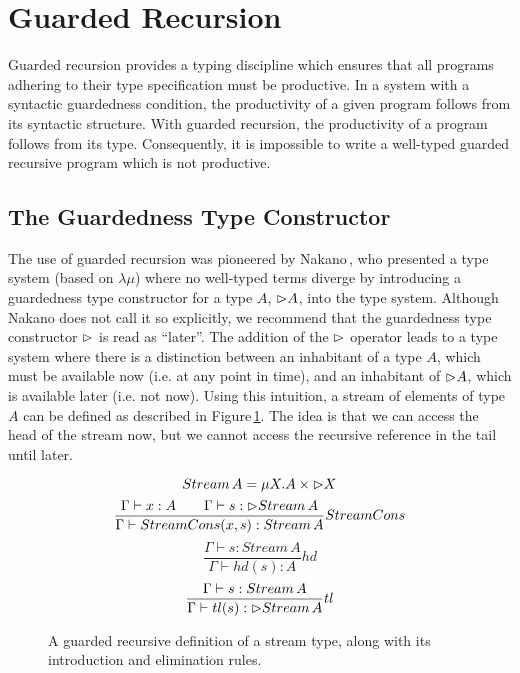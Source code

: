 
\section{Guarded Recursion}
\label{sec:guarded-recursion}

Guarded recursion provides a typing discipline which ensures that all programs adhering to their type specification must be productive. In a system with a syntactic guardedness condition, the productivity of a given program follows from its syntactic structure. With guarded recursion, the productivity of a program follows from its type. Consequently, it is impossible to write a well-typed guarded recursive program which is not productive.

\subsection{The Guardedness Type Constructor}
The use of guarded recursion was pioneered by Nakano\,\citep{Nakano:2000}, who presented a type system (based on $\lambda \mu$) where no well-typed terms diverge by introducing a guardedness type constructor for a type $A$, $\rhd A$, into the type system. Although Nakano does not call it so explicitly, we recommend that the guardedness type constructor $\rhd$ is read as ``later''. The addition of the $\rhd$ operator leads to a type system where there is a distinction between an inhabitant of a type $A$, which must be available now (i.e. at any point in time), and an inhabitant of $\rhd A$, which is available later (i.e. not now). Using this intuition, a stream of elements of type $A$ can be defined as described in Figure\,\ref{fig:guarded_recursion_stream}. The idea is that we can access the head of the stream now, but we cannot access the recursive reference in the tail until later.

\begin{figure}
\[
Stream\,A = \mu X. A \times \rhd X
\]
\[
\frac{\Gamma\vdash x : A \quad \quad \Gamma\vdash s : \rhd Stream\,A}{\Gamma\vdash StreamCons(x,s) : Stream\,A} StreamCons
\]
\[
\frac{\Gamma\vdash s : Stream\,A}{\Gamma\vdash hd(s) : A} hd
\]
\[
\frac{\Gamma\vdash s : Stream\,A}{\Gamma\vdash tl(s) : \rhd Stream\,A} tl
\]
\caption{A guarded recursive definition of a stream type, along with its introduction and elimination rules.}
\label{fig:guarded_recursion_stream}
\end{figure} 

